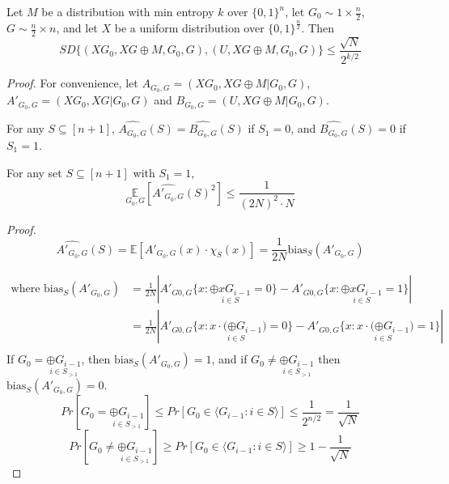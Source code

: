 \begin{theorem}
Let $M$ be a distribution with min entropy $k$ over $\{0 , 1 \}^n$, let $G_0 \sim 1 \times \frac{n}{2}$, $G \sim \frac{n}{2} \times n$, and let $X$ be a uniform distribution over $\{ 0, 1 \} ^ \frac{n}{2}$. Then 
$$SD \{ (XG_0, XG \oplus M, G_0, G), (U, XG \oplus M, G_0, G) \} \leq 
\frac{\sqrt{N}}{2^{k/2}}$$
\end{theorem}

\begin{proof}
For convenience, let $A_{G_0, G} = (XG_0, XG \oplus M | G_0 , G)$, 
$A'_{G_0,G} = (XG_0, XG | G_0 , G) $ and
$B_{G_0,G} = (U, XG \oplus M | G_0 , G)$.

\begin{claim}
For any $S \subseteq [n+1]$, $\widehat{A_{G_0,G}}(S) = \widehat{B_{G_0,G}}(S)$ if $S_1 = 0$, and 
$\widehat{B_{G_0,G}}(S) = 0$ if $S_1 = 1$.
\end{claim} 

\begin{claim}
For any set $S \subseteq [n+1]$ with $S_1 =1$, 
$$\underset{G_0, G} {\mathbb{E}} 
	[\widehat{A'_{G_0,G}}(S)^2] \leq \frac{1}{(2N)^2 \cdot N} $$
\end{claim}

\noindent \textit{Proof.}
$$ \widehat{A'_{G_0,G}}(S) = \mathbb{E}[A'_{G_0,G}(x) \cdot \chi_S(x)]
= \frac{1}{2N} \text{bias}_S(A'_{G_0, G})$$

\begin{align*}
\text{where }
\text{bias}_S(A'_{G_0, G})
&= \frac{1}{2N} \left| 
	A'_{G0,G} \{ x : \underset{i \in S} {\oplus xG_{i-1}} = 0 \} - 
	A'_{G0,G} \{ x : \underset{i \in S} {\oplus xG_{i-1}} = 1 \} 
	\right| \\
&= \frac{1}{2N} \left| 
	A'_{G0,G} \{ x : \underset{i \in S} {x \cdot (\oplus G_{i-1}}) = 0 \} - 
	A'_{G0,G} \{ x : \underset{i \in S} {x \cdot (\oplus G_{i-1}}) = 1 \} 
	\right| \\
\end{align*}
If $G_0 = \underset{i \in S_{>1}} {\oplus G_{i-1}}$, then $\text{bias}_S (A'_{G_0, G}) = 1$, and if $G_0 \neq  \underset{i \in S_{>1}} {\oplus G_{i-1}}$ then $\text{bias}_S (A'_{G_0, G}) = 0$. \\
$$Pr[G_0 =  \underset{i \in S_{>1}} {\oplus G_{i-1}}]  
\leq Pr[G_0 \in {\langle G_{i-1} : i \in S \rangle}] \leq \frac{1}{2^{n/2}}= \frac{1}{\sqrt{N}}$$
$$Pr[G_0 \neq  \underset{i \in S_{>1}} {\oplus G_{i-1}}]  
\geq Pr[G_0 \in {\langle G_{i-1} : i \in S \rangle}] \geq 1 - \frac{1}{\sqrt{N}}$$


\end{proof}
